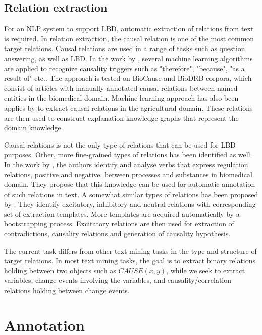 \documentclass[10pt, a4paper]{article}
\begin{document}
\subsection{Relation extraction}

For an NLP system to support LBD, automatic extraction of relations from text is required. In relation extraction, the causal relation is one of the most common target relations. 
Causal relations are used in a range of tasks such as question answering, as well as LBD. 
In the work by \cite{Mihaila2013}, several machine learning algorithms are applied to recognize causality triggers such as "therefore", "because", "as a result of" etc..
The approach is tested on BioCause and BioDRB corpora, which consist of articles with manually annotated causal relations between named entities in the biomedical domain. 
Machine learning approach has also been applies by \cite{Pechsiri2010a} to extract causal relations in the agricultural domain. 
These relations are then used to construct explanation knowledge graphs that represent the domain knowledge.

Causal relations is not the only type of relations that can be used for LBD purposes. 
Other, more fine-grained types of relations has been identified as well. In the work by \cite{Zambach2010Lexical}, the authors identify and analyse verbs that express regulation relations, positive and negative, between processes and substances in biomedical domain. 
They propose that this knowledge can be used for automatic annotation of such relations in text. A somewhat similar types of relations has been proposed by \cite{Hashimoto2012Excitatory}. 
They identify excitatory, inhibitory and neutral relations with corresponding set of extraction templates. 
More templates are acquired automatically by a bootstrapping process. 
Excitatory relations are then used for extraction of contradictions, causality relations and generation of causality hypothesis.

The current task differs from other text mining tasks in the type and structure of target relations. 
In most text mining tasks, the goal is to extract binary relations holding between two objects such as $CAUSE(x,y)$, while we seek to extract variables, change events involving the variables, and causality/correlation relations holding between change events.  

\section{Annotation}
\label{sec:annot}
\end{document}
